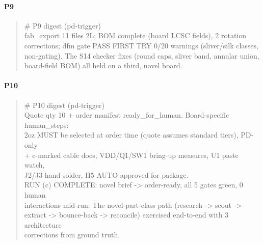 \documentclass[11pt,a4paper]{article}
\begin{document}
\paragraph*{P9}
\begin{quote}\small\ttfamily\raggedright
\# P9 digest (pd-trigger)\\
fab\_export 11 files 2L; BOM complete (board LCSC fields), 2 rotation\\
corrections; dfm gate PASS FIRST TRY 0/20 warnings (sliver/silk classes,\\
non-gating). The S14 checker fixes (round caps, sliver band, annular union,\\
board-field BOM) all held on a third, novel board.
\end{quote}
\paragraph*{P10}
\begin{quote}\small\ttfamily\raggedright
\# P10 digest (pd-trigger)\\
Quote qty 10 + order manifest ready\_for\_human. Board-specific human\_steps:\\
2oz MUST be selected at order time (quote assumes standard tiers), PD-only\\
+ e-marked cable docs, VDD/Q1/SW1 bring-up measures, U1 paste watch,\\
J2/J3 hand-solder. H5 AUTO-approved-for-package.\\
RUN (c) COMPLETE: novel brief -\textgreater{} order-ready, all 5 gates green, 0 human\\
interactions mid-run. The novel-part-class path (research -\textgreater{} scout -\textgreater{}\\
extract -\textgreater{} bounce-back -\textgreater{} reconcile) exercised end-to-end with 3 architecture\\
corrections from ground truth.
\end{quote}
\end{document}
